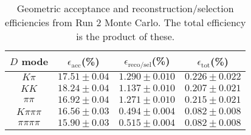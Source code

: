\begin{table}[H]
    \centering
    \begin{tabular}{cccc}
        \toprule
        $D$ mode & $\epsilon_\mathrm{acc}$(\%) &  $\epsilon_\mathrm{reco/sel}$(\%) &  $\epsilon_\mathrm{tot}$(\%) \\
        \midrule
        $K\pi$ & $17.51 \pm 0.04$ & $1.290 \pm 0.010$ & $0.226 \pm 0.022$ \\
        $KK$ & $18.24 \pm 0.04$ & $1.137 \pm 0.010$ & $0.207 \pm 0.021$ \\
        $\pi\pi$ & $16.92 \pm 0.04$ & $1.271 \pm 0.010$ & $0.215 \pm 0.021$ \\
        $K\pi\pi\pi$ & $16.56 \pm 0.03$ & $0.494 \pm 0.004$ & $0.082 \pm 0.008$ \\
        $\pi\pi\pi\pi$ & $15.90 \pm 0.03$ & $0.515 \pm 0.004$ & $0.082 \pm 0.008$ \\
        \bottomrule
    \end{tabular}
    \caption{Geometric acceptance and reconstruction/selection efficiencies from  Run 2 Monte Carlo. The total efficiency is the  product of these.}
\label{tab:selection_efficiency_run2}
\end{table}
